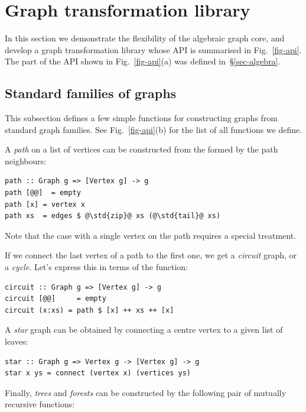 \section{Graph transformation library}\label{sec-transformations}

In this section we demonstrate the flexibility of the algebraic graph core,
and develop a graph transformation library whose API is summarised in
Fig.~\ref{fig-api}. The part of the API shown in Fig.~\ref{fig-api}(a)
was defined in~\S\ref{sec-algebra}.

\subsection{Standard families of graphs}\label{sub-families}

This subsection defines a few simple functions for constructing graphs from
standard graph families. See Fig.~\ref{fig-api}(b) for the list of all functions
we define.

A \emph{path} on a list of vertices can be constructed from the 
formed by the path neighbours:

\begin{verbatim}
path :: Graph g => [Vertex g] -> g
path [@@]  = empty
path [x] = vertex x
path xs  = edges $ @\std{zip}@ xs (@\std{tail}@ xs)
\end{verbatim}

\noindent
Note that the case with a single vertex on the path requires a special treatment.

If we connect the last vertex of a path to the first one, we get a \emph{circuit}
graph, or a \emph{cycle}. Let's express this in terms of the  function:

\begin{verbatim}
circuit :: Graph g => [Vertex g] -> g
circuit [@@]     = empty
circuit (x:xs) = path $ [x] ++ xs ++ [x]
\end{verbatim}

A \emph{star} graph can be obtained by connecting a centre vertex to a given
list of leaves:

\begin{verbatim}
star :: Graph g => Vertex g -> [Vertex g] -> g
star x ys = connect (vertex x) (vertices ys)
\end{verbatim}

Finally, \emph{trees} and \emph{forests} can be constructed by the following
pair of mutually recursive functions:


